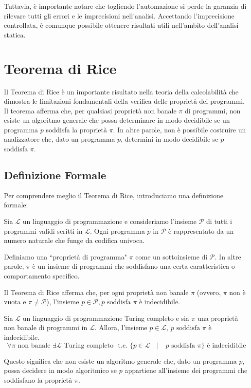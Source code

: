 Tuttavia, è importante notare che togliendo l'automazione si perde la garanzia di rilevare
tutti gli errori e le imprecisioni nell'analisi. Accettando l'imprecisione controllata, è
comunque possibile ottenere risultati utili nell'ambito dell'analisi statica.

\section{Teorema di Rice}

Il Teorema di Rice è un importante risultato nella
teoria della calcolabilità che dimostra le limitazioni fondamentali della verifica
delle proprietà dei programmi. Il teorema afferma che, per qualsiasi proprietà non banale
$\pi$ di programmi, non esiste un algoritmo generale che possa determinare in modo decidibile
se un programma $p$ soddisfa la proprietà $\pi$. In altre parole, non è possibile costruire un
analizzatore che, dato un programma $p$, determini in modo decidibile se $p$ soddisfa $\pi$.

\subsection{Definizione Formale}

Per comprendere meglio il Teorema di Rice, introduciamo una definizione formale:

Sia $\mathcal{L}$ un linguaggio di programmazione e consideriamo l'insieme $\mathcal{P}$
di tutti i programmi validi scritti in $\mathcal{L}$. Ogni programma $p$ in $\mathcal{P}$ è
rappresentato da un numero naturale che funge da codifica univoca.

Definiamo una ``proprietà di programma" $\pi$ come un sottoinsieme di $\mathcal{P}$. In altre parole,
$\pi$ è un insieme di programmi che soddisfano una certa caratteristica o comportamento specifico.

Il Teorema di Rice afferma che, per ogni proprietà non banale $\pi$ (ovvero, $\pi$ non è vuota e
$\pi \neq \mathcal{P}$), l'insieme ${p \in \mathcal{P}, p \text{ soddisfa } \pi}$ è indecidibile.
\begin{tcolorbox}[title = {Teorema di Rice}]
    Sia $\mathcal{L}$ un linguaggio di programmazione Turing completo e sia $\pi$ una proprietà non banale
    di programmi in $\mathcal{L}$. Allora, l'insieme ${p \in \mathcal{L} ,\, p \text{ soddisfa } \pi}$ è indecidibile.
    \[
      \forall \pi \text{ non banale } \exists \mathcal{L} \text{ Turing completo } \text{ t.c. } \{p \in \mathcal{L} \quad |
      \quad p \text{ soddisfa } \pi\} \text{ è indecidibile}  
    \]
\end{tcolorbox}
Questo significa che non esiste un algoritmo generale che, dato un programma $p$,
possa decidere in modo algoritmico se $p$ appartiene all'insieme dei programmi che
soddisfano la proprietà $\pi$.
